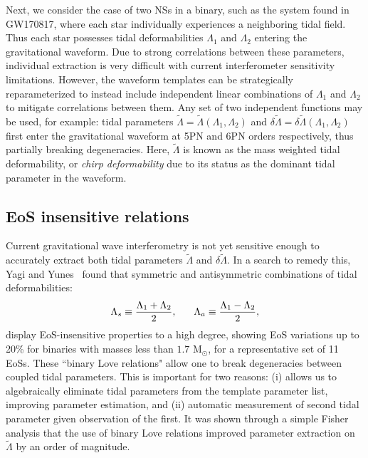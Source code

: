 \documentclass[prd,twocolumn,nofootinbib,superscriptaddress,amsmath,amssymb]{revtex4-1}
\begin{document}
Next, we consider the case of two NSs in a binary, such as the system found in GW170817, where each star 
individually experiences a neighboring tidal field.
Thus each star possesses tidal deformabilities $\Lambda_1$ and $\Lambda_2$ entering the gravitational waveform.
Due to strong correlations between these parameters, individual extraction is very difficult with current interferometer sensitivity limitations.
However, the waveform templates can be strategically reparameterized to instead include independent linear combinations of $\Lambda_1$ and $\Lambda_2$ to mitigate correlations between them. 
Any set of two independent functions may be used, for example: tidal parameters $\tilde{\Lambda}=\tilde{\Lambda}(\Lambda_1,\Lambda_2)$ and $\delta \tilde{\Lambda}=\delta \tilde{\Lambda}(\Lambda_1,\Lambda_2)$~\cite{Wade:tidalCorrections} first enter the gravitational waveform at 5PN and 6PN orders respectively, thus partially breaking degeneracies.
Here, $\tilde{\Lambda}$ is known as the mass weighted tidal deformability, or \emph{chirp deformability} due to its status as the dominant tidal parameter in the waveform. 

\subsection{EoS insensitive relations}\label{sec:eosInsensitive}
Current gravitational wave interferometry is not yet sensitive enough to accurately extract both tidal parameters $\tilde{\Lambda}$ and $\delta\tilde{\Lambda}$.
In a search to remedy this, Yagi and Yunes~\cite{Yagi:binLove} found that symmetric and antisymmetric combinations of tidal deformabilities:
\begin{equation}
\Lambda_s \equiv \frac{\Lambda_1 + \Lambda_2}{2}, \hspace{6mm} \Lambda_a \equiv \frac{\Lambda_1 - \Lambda_2}{2},
\end{equation}
display EoS-insensitive properties to a high degree, showing EoS variations up to 20\% for binaries with masses less than $1.7 \text{ M}_{\odot}$, for a representative set of 11 EoSs. 
These ``binary Love relations" allow one to break degeneracies between coupled tidal parameters.
This is important for two reasons: (i) allows us to algebraically eliminate tidal parameters from the template parameter list, improving parameter estimation, and (ii) automatic measurement of second tidal parameter given observation of the first.
It was shown through a simple Fisher analysis that the use of binary Love relations improved parameter extraction on $\tilde{\Lambda}$ by an order of magnitude.
\end{document}
